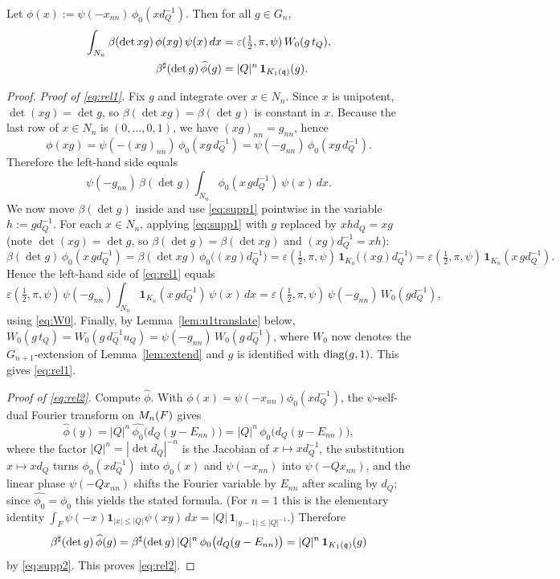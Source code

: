 \begin{qtwolemma}\label{lem:relations}
Let $\phi(x):=\psi(-x_{nn})\,\phi_0(x d_Q^{-1})$. Then for all $g\in G_n$,
\begin{align}
\int_{N_n}\beta(\det xg)\,\phi(xg)\,\psi(x)\,dx
&=\varepsilon(\tfrac12,\pi,\psi)\,W_0(g\,t_Q),\label{eq:rel1}\\
\beta^\sharp(\det g)\,\widehat\phi(g)&=|Q|^n\,\mathbf 1_{K_1(\mathfrak{q})}(g).\label{eq:rel2}
\end{align}
\end{qtwolemma}

\begin{proof}
\emph{Proof of \eqref{eq:rel1}.} Fix $g$ and integrate over $x\in N_n$. Since $x$ is
unipotent, $\det(xg)=\det g$, so $\beta(\det xg)=\beta(\det g)$ is constant in $x$.
Because the last row of $x\in N_n$ is $(0,\dots,0,1)$, we have $(xg)_{nn}=g_{nn}$, hence
\[
\phi(xg)=\psi(-(xg)_{nn})\,\phi_0(xg\,d_Q^{-1})=\psi(-g_{nn})\,\phi_0(xg\,d_Q^{-1}).
\]
Therefore the left-hand side equals
\[
\psi(-g_{nn})\,\beta(\det g)\int_{N_n}\phi_0(x\,g d_Q^{-1})\,\psi(x)\,dx .
\]
We now move $\beta(\det g)$ inside and use \eqref{eq:supp1} pointwise in the variable
$h:=g d_Q^{-1}$. For each $x\in N_n$, applying \eqref{eq:supp1} with $g$ replaced by $xh d_Q=xg$
(note $\det(xg)=\det g$, so $\beta(\det g)=\beta(\det xg)$ and $(xg)d_Q^{-1}=x h$):
\[
\beta(\det g)\,\phi_0(x\,g d_Q^{-1})=\beta(\det xg)\,\phi_0\big((xg)d_Q^{-1}\big)
=\varepsilon(\tfrac12,\pi,\psi)\,\mathbf 1_{K_n}\big((xg)d_Q^{-1}\big)
=\varepsilon(\tfrac12,\pi,\psi)\,\mathbf 1_{K_n}(x\,g d_Q^{-1}).
\]
Hence the left-hand side of \eqref{eq:rel1} equals
\[
\varepsilon(\tfrac12,\pi,\psi)\,\psi(-g_{nn})\int_{N_n}\mathbf 1_{K_n}(x\,g d_Q^{-1})\,\psi(x)\,dx
=\varepsilon(\tfrac12,\pi,\psi)\,\psi(-g_{nn})\,W_0(g d_Q^{-1}),
\]
using \eqref{eq:W0}. Finally, by Lemma~\ref{lem:u1translate} below,
$W_0(g\,t_Q)=W_0(g\,d_Q^{-1}u_Q)=\psi(-g_{nn})\,W_0(g\,d_Q^{-1})$, where $W_0$ now
denotes the $G_{n+1}$-extension of Lemma~\ref{lem:extend} and $g$ is identified with
$\operatorname{diag}(g,1)$. This gives \eqref{eq:rel1}.

\emph{Proof of \eqref{eq:rel2}.} Compute $\widehat\phi$. With $\phi(x)=\psi(-x_{nn})\phi_0(x d_Q^{-1})$,
the $\psi$-self-dual Fourier transform on $M_n(F)$ gives
\[
\widehat\phi(y)=|Q|^{n}\,\widehat{\phi_0}\big(d_Q(y-E_{nn})\big)=|Q|^{n}\,\phi_0\big(d_Q(y-E_{nn})\big),
\]
where the factor $|Q|^{n}=|\det d_Q|^{-n}$ is the Jacobian of $x\mapsto x d_Q^{-1}$, the substitution
$x\mapsto x d_Q$ turns $\phi_0(x d_Q^{-1})$ into $\phi_0(x)$ and $\psi(-x_{nn})$ into $\psi(-Q x_{nn})$,
and the linear phase $\psi(-Q x_{nn})$ shifts the Fourier variable by $E_{nn}$ after scaling by $d_Q$;
since $\widehat{\phi_0}=\phi_0$ this yields the stated formula. (For $n=1$ this is the elementary identity
$\int_{F}\psi(-x)\mathbf 1_{|x|\le|Q|}\psi(xy)\,dx=|Q|\,\mathbf 1_{|y-1|\le|Q|^{-1}}$.) Therefore
\[
\beta^\sharp(\det g)\,\widehat\phi(g)=\beta^\sharp(\det g)\,|Q|^{n}\,\phi_0\big(d_Q(g-E_{nn})\big)
=|Q|^{n}\,\mathbf 1_{K_1(\mathfrak{q})}(g)
\]
by \eqref{eq:supp2}. This proves \eqref{eq:rel2}.
\end{proof}

